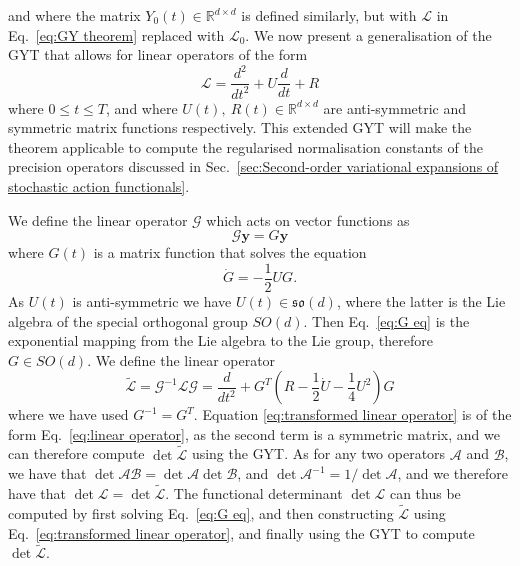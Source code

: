 \documentclass[withindex,glossary,techreport]{cam-thesis}
\begin{document}
\begin{appendices}
and where the matrix $Y_{0}(t)\in\mathbb{R}^{d\times d}$
is defined similarly, but with $\mathcal{L}$ in Eq.~\ref{eq:GY theorem}
replaced with $\mathcal{L}_{0}$. We now present a generalisation of the GYT that allows for linear operators of the form
\begin{equation} \label{eq:extended GYT form operator}
\mathcal{L}=\frac{d^{2}}{dt^{2}}+U\frac{d}{dt}+R
\end{equation}
where $0\leq t\leq T$, and where $U(t),\ R(t)\in\mathbb{R}^{d\times d}$
are anti-symmetric and symmetric matrix functions respectively. This extended GYT will make the theorem applicable to compute the regularised normalisation constants of the precision operators discussed in Sec.~\ref{sec:Second-order variational expansions of stochastic action functionals}.

We define the linear operator $\mathcal{G}$ which acts on vector
functions as
\begin{equation} \label{eq:G eq}
	\mathcal{G}\mathbf{y}=G\mathbf{y}
\end{equation}
where $G(t)$ is a matrix function that solves the equation
\begin{equation}
\dot{G}=-\frac{1}{2}UG.\label{eq:G eq}
\end{equation}
As $U(t)$ is anti-symmetric we have $U(t) \in \mathfrak{so}(d)$, where the latter is the Lie algebra of the special orthogonal group $SO(d)$. Then Eq.~\ref{eq:G eq} is the exponential mapping from the Lie algebra to the Lie group, therefore $G \in SO(d)$. We define the linear operator
\begin{equation} \label{eq:transformed linear operator}
\tilde{\mathcal{L}}=\mathcal{G}^{-1}\mathcal{L}\mathcal{G}=\frac{d}{dt^{2}}+G^{T}\left(R-\frac{1}{2}\dot{U}-\frac{1}{4}U^{2}\right)G
\end{equation}
where we have used $G^{-1} = G^T$. Equation \ref{eq:transformed linear operator} is of the form Eq.~\ref{eq:linear operator}, as the second term is a symmetric matrix, and we can therefore compute $\det\tilde{\mathcal{L}}$ using the GYT. As for any two operators $\mathcal{A}$
and $\mathcal{B}$, we have that $\det\mathcal{A\mathcal{B}}=\det\mathcal{A}\det\mathcal{B}$,
and $\det\mathcal{A}^{-1}=1/\det\mathcal{A}$, and we therefore have
that $\det\mathcal{L}=\det\tilde{\mathcal{L}}$. The functional determinant
$\det\mathcal{L}$ can thus be computed by first solving Eq.~\ref{eq:G eq}, and then
constructing $\tilde{\mathcal{L}}$ using Eq.~\ref{eq:transformed linear operator},
and finally using the GYT to compute $\det\tilde{\mathcal{L}}$.


\end{appendices}
\end{document}
